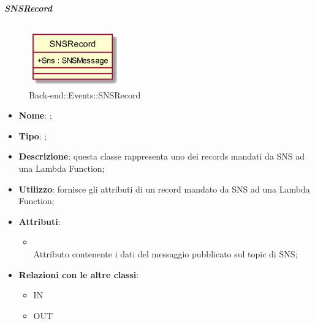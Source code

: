 \hypertarget{SNSRecord_label}{\subparagraph{SNSRecord}}
\begin{figure}[h]
	\centering
	\includegraphics[width=0.35\textwidth,height=\textheight,keepaspectratio]{images/ClassSNSRecord.png}
	\caption{Back-end::Events::SNSRecord}
\end{figure}
\begin{itemize}
	\item \textbf{Nome}: ;
	\item \textbf{Tipo}: ;
	\item \textbf{Descrizione}: questa classe rappresenta uno dei records mandati da SNS ad una Lambda Function;
	\item \textbf{Utilizzo}: fornisce gli attributi di un record mandato da SNS ad una Lambda Function;
	\item \textbf{Attributi}:
	\begin{itemize}
		\item[]  \\
		Attributo contenente i dati del messaggio pubblicato sul topic di SNS;
	\end{itemize}
	\item \textbf{Relazioni con le altre classi}:
	\begin{itemize}
		\item IN \hyperlink{SNSEvent_label}{}
		\item OUT \hyperlink{SNSMessage_label}{}
	\end{itemize}
\end{itemize}
\FloatBarrier

